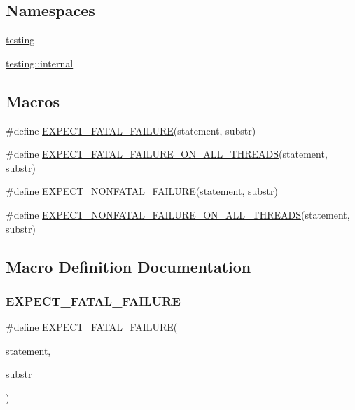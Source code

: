 \subsection*{Namespaces}
\begin{DoxyCompactItemize}
\item 
 \hyperlink{namespacetesting}{testing}
\item 
 \hyperlink{namespacetesting_1_1internal}{testing\+::internal}
\end{DoxyCompactItemize}
\subsection*{Macros}
\begin{DoxyCompactItemize}
\item 
\#define \hyperlink{gtest-spi_8h_a819a3fd7f8b8cf24b6f1b3a26708973d}{E\+X\+P\+E\+C\+T\+\_\+\+F\+A\+T\+A\+L\+\_\+\+F\+A\+I\+L\+U\+RE}(statement,  substr)
\item 
\#define \hyperlink{gtest-spi_8h_ad8aac5bc859b2ddc07583636ae4f45cf}{E\+X\+P\+E\+C\+T\+\_\+\+F\+A\+T\+A\+L\+\_\+\+F\+A\+I\+L\+U\+R\+E\+\_\+\+O\+N\+\_\+\+A\+L\+L\+\_\+\+T\+H\+R\+E\+A\+DS}(statement,  substr)
\item 
\#define \hyperlink{gtest-spi_8h_a8376fd6821bd88fd806697355e79e138}{E\+X\+P\+E\+C\+T\+\_\+\+N\+O\+N\+F\+A\+T\+A\+L\+\_\+\+F\+A\+I\+L\+U\+RE}(statement,  substr)
\item 
\#define \hyperlink{gtest-spi_8h_a9f4cf1f150fe9facfc4cbf0bae646ee9}{E\+X\+P\+E\+C\+T\+\_\+\+N\+O\+N\+F\+A\+T\+A\+L\+\_\+\+F\+A\+I\+L\+U\+R\+E\+\_\+\+O\+N\+\_\+\+A\+L\+L\+\_\+\+T\+H\+R\+E\+A\+DS}(statement,  substr)
\end{DoxyCompactItemize}


\subsection{Macro Definition Documentation}
\mbox{\label{gtest-spi_8h_a819a3fd7f8b8cf24b6f1b3a26708973d}} 
\subsubsection{\texorpdfstring{E\+X\+P\+E\+C\+T\+\_\+\+F\+A\+T\+A\+L\+\_\+\+F\+A\+I\+L\+U\+RE}{EXPECT\_FATAL\_FAILURE}}
{\footnotesize\ttfamily \#define E\+X\+P\+E\+C\+T\+\_\+\+F\+A\+T\+A\+L\+\_\+\+F\+A\+I\+L\+U\+RE(\begin{DoxyParamCaption}\item[{}]{statement,  }\item[{}]{substr }\end{DoxyParamCaption})}

